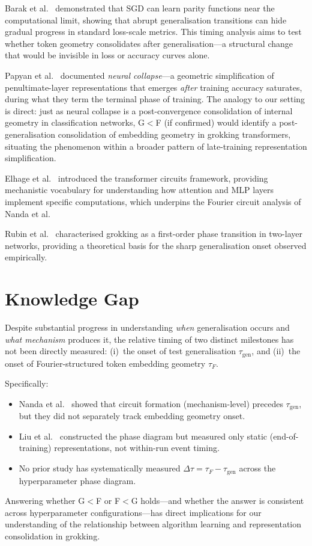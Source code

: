 \documentclass[12pt,openany,a4paper]{book}
\newcommand{\taug}{\tau_{\mathrm{gen}}}
\newcommand{\tauf}{\tau_{F}}
\newcommand{\Dtau}{\Delta\tau}
\begin{document}
Barak et al.\ \cite{barak2022hidden} demonstrated that SGD can learn
parity functions near the computational limit, showing that abrupt
generalisation transitions can hide gradual progress in standard
loss-scale metrics.
This timing analysis aims to test whether token geometry consolidates
after generalisation---a structural change that would be invisible
in loss or accuracy curves alone.

Papyan et al.\ \cite{papyan2020prevalence} documented \emph{neural
collapse}---a geometric simplification of penultimate-layer
representations that emerges \emph{after} training accuracy saturates,
during what they term the terminal phase of training.
The analogy to our setting is direct: just as neural collapse is a
post-convergence consolidation of internal geometry in classification
networks, G$<$F (if confirmed) would identify a post-generalisation
consolidation of embedding geometry in grokking transformers,
situating the phenomenon within a broader pattern of late-training
representation simplification.

Elhage et al.\ \cite{elhage2021mathematical} introduced the
transformer circuits framework, providing mechanistic vocabulary
for understanding how attention and MLP layers implement specific
computations, which underpins the Fourier circuit analysis of
Nanda et al.

Rubin et al.\ \cite{rubin2024grokking} characterised grokking as
a first-order phase transition in two-layer networks, providing a
theoretical basis for the sharp generalisation onset observed
empirically.

\section{Knowledge Gap}

Despite substantial progress in understanding \emph{when} generalisation
occurs and \emph{what mechanism} produces it, the relative timing of
two distinct milestones has not been directly measured:
(i)~the onset of test generalisation $\taug$, and
(ii)~the onset of Fourier-structured token embedding geometry $\tauf$.

Specifically:
\begin{itemize}
  \item Nanda et al.\ \cite{nanda2023progress} showed that circuit
    formation (mechanism-level) precedes $\taug$, but they did not
    separately track embedding geometry onset.
  \item Liu et al.\ \cite{liu2022towards} constructed the phase diagram
    but measured only static (end-of-training) representations, not
    within-run event timing.
  \item No prior study has systematically measured $\Dtau = \tauf - \taug$
    across the hyperparameter phase diagram.
\end{itemize}
Answering whether G$<$F or F$<$G holds---and whether the answer is
consistent across hyperparameter configurations---has direct implications
for our understanding of the relationship between algorithm learning
and representation consolidation in grokking.
\end{document}

